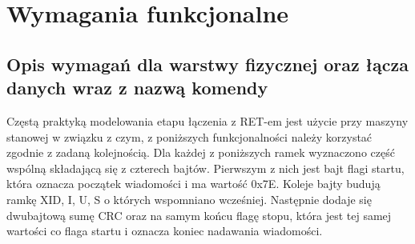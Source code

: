 \chapter{Wymagania funkcjonalne}
	\section{Opis wymagań dla warstwy fizycznej oraz łącza danych wraz z nazwą komendy}
		\noindent
		Częstą praktyką modelowania etapu łączenia z RET-em jest użycie przy maszyny stanowej w związku z czym, z poniższych funkcjonalności należy korzystać zgodnie z zadaną kolejnością.
		Dla każdej z poniższych ramek wyznaczono część wspólną składającą się z czterech bajtów. Pierwszym z nich jest bajt flagi startu, która oznacza początek wiadomości i ma wartość 0x7E.
		Koleje bajty budują ramkę XID, I, U, S o których wspomniano wcześniej. Następnie dodaje się dwubajtową sumę CRC oraz na samym końcu flagę stopu, która jest tej samej wartości co flaga startu i oznacza koniec nadawania wiadomości.
